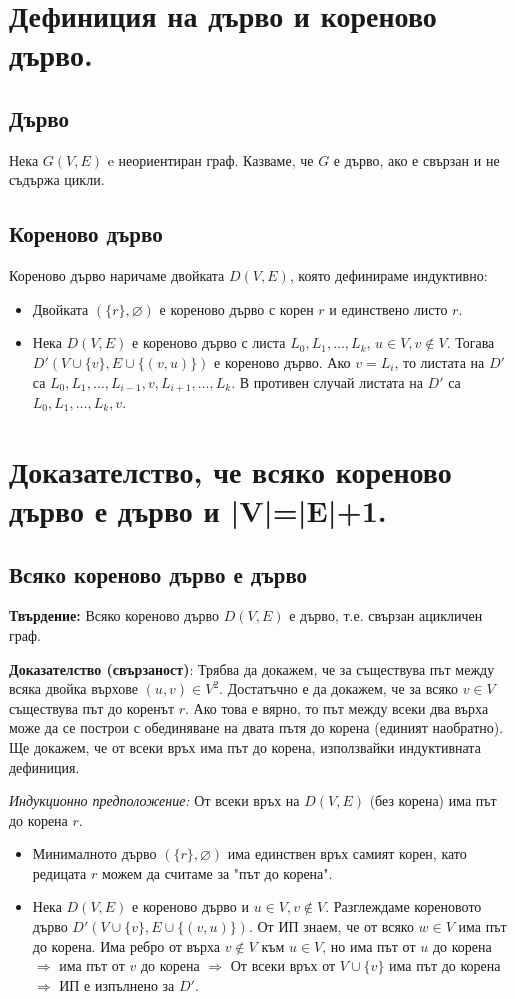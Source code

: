 \documentclass[fleqn,12pt]{article}
\begin{document}
\begin{flushleft}
\section{Дефиниция на дърво и кореново дърво.}

\subsection{Дърво}
Нека $G(V, E)$ e неориентиран граф. Казваме, че $G$ е дърво, ако е свързан и не съдържа цикли.

\subsection{Кореново дърво}
Кореново дърво наричаме двойката $D(V, E)$, която дефинираме индуктивно:
\begin{itemize}
	\item Двойката $(\{r\}, \varnothing)$ е кореново дърво с корен $r$ и единствено листо $r$.
	\item Нека $D(V,E)$ е кореново дърво с листа $L_0, L_1, \dots, L_k$, $u \in V, v \notin V$. Тогава $D'(V \cup \{v\}, E \cup \{ (v, u)\})$ е кореново дърво.
	Ако $v = L_i$, то листата на $D'$ са $L_0, L_1, \dots, L_{i-1}, v, L_{i+1}, \dots, L_k$. В противен случай листата на $D'$ са 
	$L_0, L_1, \dots, L_k, v$.
\end{itemize}

\section{Доказателство, че всяко кореново дърво е дърво и |V|=|E|+1.}
\subsection{Всяко кореново дърво е дърво}
\textbf{Твърдение:} Всяко кореново дърво $D(V,E)$ е дърво, т.е. свързан ацикличен граф.

\textbf{Доказателство (свързаност)}: Трябва да докажем, че за съществува път между всяка двойка върхове $(u, v) \in V^2$. Достатъчно е да докажем, че 
за всяко $v \in V$ съществува път до коренът $r$. Ако това е вярно, то път между всеки два върха може да се построи с обединяване на двата пътя до корена 
(единият наобратно). Ще докажем, че от всеки връх има път до корена, използвайки индуктивната дефиниция.

\textit{Индукционно предположение:} От всеки връх на $D(V,E)$ (без корена) има път до корена $r$. 
\begin{itemize}
	\item Минималното дърво $(\{r\}, \varnothing)$ има единствен връх самият корен, като редицата $r$ можем да считаме за "път до корена".
	\item Нека $D(V,E)$ е кореново дърво и $u \in V, v \notin V$. Разглеждаме кореновото дърво $D'(V \cup \{v\}, E \cup \{ (v, u)\})$.
	От ИП знаем, че от всяко $w \in V$ има път до корена. Има ребро от върха $v \notin V$ към $u \in V$, но има път от $u$ до корена $\Rightarrow$
	има път от $v$ до корена $\Rightarrow$ От всеки връх от $V \cup \{v\}$ има път до корена $\Rightarrow$ ИП е изпълнено за $D'$.
\end{itemize}


\end{flushleft}
\end{document}
